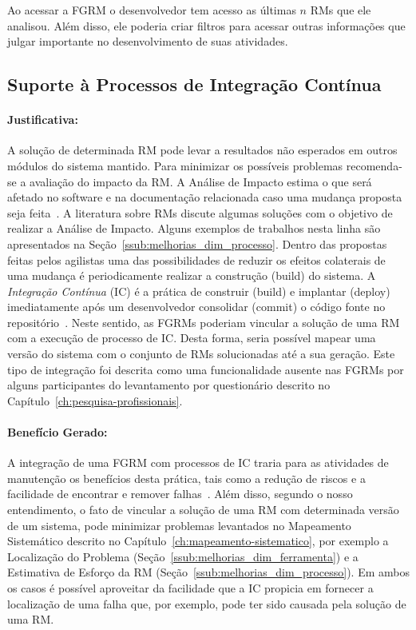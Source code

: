 Ao acessar a FGRM o desenvolvedor tem acesso as últimas $n$ RMs que ele
analisou. Além disso, ele poderia criar filtros para acessar outras informações
que julgar importante no desenvolvimento de suas atividades.

\subsection{Suporte à Processos de Integração Contínua}
\label{sub:suporte_integracao_continua}


\paragraph{Justificativa:}
\label{par:justificativa_s05}

A solução de determinada RM pode levar a resultados não esperados em outros
módulos do sistema mantido. Para minimizar os possíveis problemas recomenda-se a
avaliação do impacto da RM\@. A Análise de Impacto estima o que será afetado no
software e na documentação relacionada caso uma mudança proposta seja
feita~\cite{arnold1996software}. A literatura sobre RMs discute algumas soluções
com o objetivo de realizar a Análise de Impacto. Alguns exemplos de trabalhos
nesta linha são apresentados na Seção~\ref{ssub:melhorias_dim_processo}. Dentro
das propostas feitas pelos agilistas uma das possibilidades de reduzir os
efeitos colaterais de uma mudança é periodicamente realizar a construção (build)
do sistema. A \textit{Integração Contínua} (IC) é a prática de construir (build)
e implantar (deploy) imediatamente após um desenvolvedor consolidar (commit) o
código fonte no repositório~\cite{aiello2010configuration}. Neste sentido,
as FGRMs poderiam vincular a solução de uma RM com a execução de processo de
IC\@. Desta forma, seria possível mapear uma versão do sistema com o conjunto de
RMs solucionadas até a sua geração. Este tipo de integração foi descrita como
uma funcionalidade ausente nas FGRMs por alguns participantes do levantamento
por questionário descrito no Capítulo~\ref{ch:pesquisa-profissionais}.

\paragraph{Benefício Gerado:}
\label{par:papéis_afetados_s05}

A integração de uma FGRM com processos de IC traria para as atividades de
manutenção os benefícios desta prática, tais como a redução de riscos e a
facilidade de encontrar e remover falhas~\cite{fowler2006continuous}.  Além
disso, segundo o nosso entendimento, o fato de vincular a solução de uma RM com
determinada versão de um sistema, pode minimizar problemas levantados no
Mapeamento Sistemático descrito no Capítulo~\ref{ch:mapeamento-sistematico},
por exemplo a Localização do Problema
(Seção~\ref{ssub:melhorias_dim_ferramenta}) e a Estimativa de Esforço da RM
(Seção~\ref{ssub:melhorias_dim_processo}). Em ambos os casos é possível
aproveitar da facilidade que a IC propicia em fornecer a localização de uma
falha que, por exemplo, pode ter sido causada pela solução de uma RM\@.

